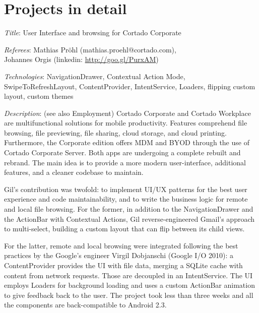 \documentclass[letterpaper]{article}
\renewenvironment{itemize}{
  \begin{list}{}{
    \setlength{\leftmargin}{1.5em}
  }
}{
  \end{list}
}
\newenvironment{itemize1}{
  \begin{list}{}{
    \setlength{\leftmargin}{0em}
  }
}{
  \end{list}
}
\begin{document}
\iffalse

\section*{Projects in detail}
\begin{itemize1}
\item
\begin{itemize}
\item {\it Title}: User Interface and browsing for Cortado Corporate 
\item {\it Referees}: Mathias Pr\"ohl (mathias.proehl@cortado.com),\\\phantom{xxxxxxx.}Johannes Orgis (linkedin: \url{http://goo.gl/PurxAM})
\item {\it Technologies}: NavigationDrawer, Contextual Action Mode, SwipeToRefreshLayout, ContentProvider, IntentService, Loaders, flipping custom layout, custom themes

\item {\it Description}: (see also Employment) 
Cortado Corporate and Cortado Workplace are multifunctional solutions for mobile productivity. Features comprehend file browsing, file previewing, file sharing, cloud storage, and cloud printing. Furthermore, the Corporate edition offers MDM and BYOD through the use of Cortado Corporate Server. Both apps are undergoing a complete rebuilt and rebrand. The main idea is to provide a more modern user-interface, additional features, and a cleaner codebase to maintain.
\medskip

Gil's contribution was twofold: to implement UI/UX patterns for the best user experience and code maintainability, and to write the business logic for remote and local file browsing. 
For the former, in addition to the NavigationDrawer and the ActionBar with Contextual Actions, Gil reverse-engineered Gmail's approach to multi-select, building a custom layout that can flip between its child views. 
\medskip

For the latter, remote and local browsing were integrated following the best practices by the Google's engineer Virgil Dobjanschi (Google I/O 2010): a ContentProvider provides the UI with file data, merging a SQLite cache with content from network requests. Those are decoupled in an IntentService. The UI employs Loaders for background loading and uses a custom ActionBar animation to give feedback back to the user. The project took less than three weeks and all the components are back-compatible to Android 2.3.
\end{itemize}


\end{itemize1}
\end{document}
